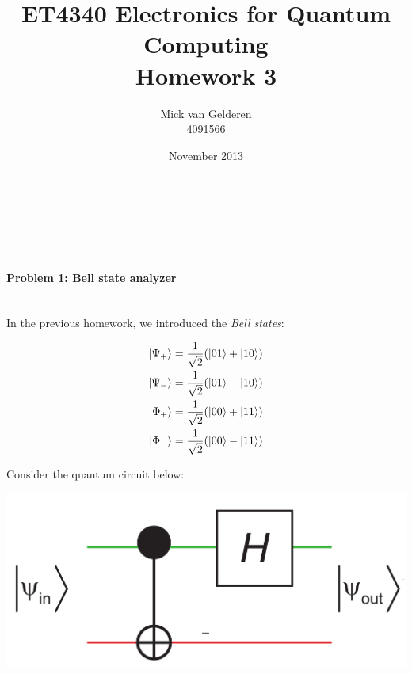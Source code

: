 \documentclass[12pt]{article}
\title{ET4340 Electronics for Quantum Computing\\Homework 3}
\author{
    Mick van Gelderen\\4091566
}
\date{November 2013}
\newcommand{\rsqrt}[1]{\ensuremath{\frac{1}{\sqrt{#1}}}}
\begin{document}
\maketitle
\hfill\\\\\\

\paragraph{Problem 1: Bell state analyzer} \hfill \\

In the previous homework, we introduced the \emph{Bell states}:

\begin{align*}
    \ket{\Psi_+} &= \rsqrt{2} (\ket{01} + \ket{10}) \\
    \ket{\Psi_-} &= \rsqrt{2} (\ket{01} - \ket{10}) \\
    \ket{\Phi_+} &= \rsqrt{2} (\ket{00} + \ket{11}) \\
    \ket{\Phi_-} &= \rsqrt{2} (\ket{00} - \ket{11}) \\
\end{align*}

Consider the quantum circuit below:

\begin{center}\includegraphics[width=.4\textwidth]{problem-1.png}\end{center}
\end{document}
